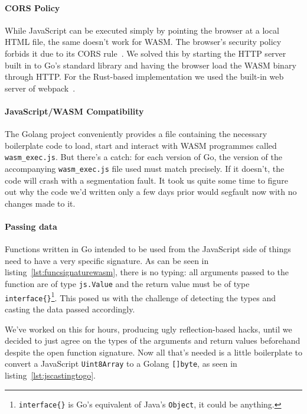 \paragraph{CORS Policy} While JavaScript can be executed simply by pointing the browser at a local \gls{HTML} file, the same doesn't work for \gls{WASM}.
The browser's security policy forbids it due to its \gls{CORS} rule~\cite{cors}.
We solved this by starting the \gls{HTTP} server built in to Go's standard library and having the browser load the \gls{WASM} binary through \gls{HTTP}.
For the Rust-based implementation we used the built-in web server of webpack~\cite{webpack}.

\paragraph{JavaScript/WASM Compatibility} The Golang project conveniently provides a file containing the necessary boilerplate code to load, start and interact with \gls{WASM} programmes called \texttt{wasm\_exec.js}.
But there's a catch: for each version of Go, the version of the accompanying \texttt{wasm\_exec.js} file used must match precisely.
If it doesn't, the code will crash with a segmentation fault.
It took us quite some time to figure out why the code we'd written only a few days prior would segfault now with no changes made to it.

\paragraph{Passing data} Functions written in Go intended to be used from the JavaScript side of things need to have a very specific signature.
As can be seen in listing~\ref{lst:funcsignaturewasm}, there is no typing: all arguments passed to the function are of type \texttt{js.Value} and the return value must be of type \texttt{interface\{\}}\footnote{\texttt{interface\{\}} is Go's equivalent of Java's \texttt{Object}, it could be anything.}.
This posed us with the challenge of detecting the types and casting the data passed accordingly.



We've worked on this for hours, producing ugly reflection-based hacks, until we decided to just agree on the types of the arguments and return values beforehand despite the open function signature.
Now all that's needed is a little boilerplate to convert a JavaScript \texttt{Uint8Array} to a Golang \texttt{[]byte}, as seen in listing~\ref{lst:jscastingtogo}.

